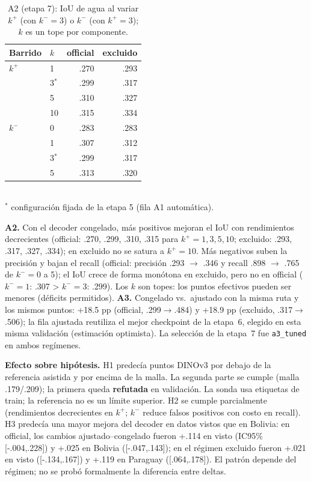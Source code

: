 \documentclass[conference]{IEEEtran}
\begin{document}
\begin{table}[!t]\centering\footnotesize\caption{A2 (etapa 7): IoU de agua al variar $k^+$ (con $k^-{=}3$) o $k^-$ (con $k^+{=}3$); $k$ es un tope por componente.}
\begin{tabular}{@{}llrr@{}}\toprule
Barrido & $k$ & official & excluido\\\midrule
$k^+$ & 1 & .270 & .293\\
 & 3$^*$ & .299 & .317\\
 & 5 & .310 & .327\\
 & 10 & .315 & .334\\
\midrule
$k^-$ & 0 & .283 & .283\\
 & 1 & .307 & .312\\
 & 3$^*$ & .299 & .317\\
 & 5 & .313 & .320\\
\bottomrule\end{tabular}\\\footnotesize $^*$ configuraci\'on fijada de la etapa 5 (fila A1 autom\'atica).\end{table}
\textbf{A2.} Con el decoder congelado, m\'as positivos mejoran el IoU con rendimientos decrecientes (official: .270, .299, .310, .315 para $k^+{=}1,3,5,10$; excluido: .293, .317, .327, .334); en excluido no se satura a $k^+{=}10$. M\'as negativos suben la precisi\'on y bajan el recall (official: precisi\'on .293 $\to$ .346 y recall .898 $\to$ .765 de $k^-{=}0$ a 5); el IoU crece de forma mon\'otona en excluido, pero no en official ($k^-{=}1$: .307 > $k^-{=}3$: .299). Los $k$ son topes: los puntos efectivos pueden ser menores (d\'eficits permitidos). \textbf{A3.} Congelado vs.\ ajustado con la misma ruta y los mismos puntos: +18.5 pp (official, .299$\to$.484) y +18.9 pp (excluido, .317$\to$.506); la fila ajustada reutiliza el mejor checkpoint de la etapa~6, elegido en esta misma validaci\'on (estimaci\'on optimista). La selecci\'on de la etapa~7 fue \texttt{a3\_tuned} en ambos reg\'imenes.

\textbf{Efecto sobre hip\'otesis.} H1 predec\'ia puntos DINOv3 por debajo de la referencia asistida y por encima de la malla. La segunda parte se cumple (malla .179/.209); la primera queda \textbf{refutada} en validaci\'on. La sonda usa etiquetas de train; la referencia no es un l\'imite superior. H2 se cumple parcialmente (rendimientos decrecientes en $k^+$; $k^-$ reduce falsos positivos con costo en recall). H3 predec\'ia una mayor mejora del decoder en datos vistos que en Bolivia: en official, los cambios ajustado--congelado fueron +.114 en visto (IC95\% [-.004,.228]) y +.025 en Bolivia ([-.047,.143]); en el r\'egimen excluido fueron +.021 en visto ([-.134,.167]) y +.119 en Paraguay ([.064,.178]). El patr\'on depende del r\'egimen; no se prob\'o formalmente la diferencia entre deltas.
\end{document}
